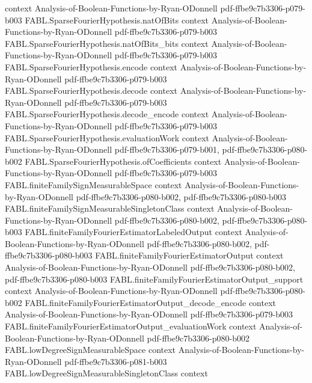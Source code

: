 \begin{theorem}
  {context}
  {Analysis-of-Boolean-Functions-by-Ryan-ODonnell}
  {pdf-ffbe9c7b3306-p079-b003}
\proofstep
  {FABL.SparseFourierHypothesis.natOfBits}
  {context}
  {Analysis-of-Boolean-Functions-by-Ryan-ODonnell}
  {pdf-ffbe9c7b3306-p079-b003}
\proofstep
  {FABL.SparseFourierHypothesis.natOfBits_bits}
  {context}
  {Analysis-of-Boolean-Functions-by-Ryan-ODonnell}
  {pdf-ffbe9c7b3306-p079-b003}
\proofstep
  {FABL.SparseFourierHypothesis.encode}
  {context}
  {Analysis-of-Boolean-Functions-by-Ryan-ODonnell}
  {pdf-ffbe9c7b3306-p079-b003}
\proofstep
  {FABL.SparseFourierHypothesis.decode}
  {context}
  {Analysis-of-Boolean-Functions-by-Ryan-ODonnell}
  {pdf-ffbe9c7b3306-p079-b003}
\proofstep
  {FABL.SparseFourierHypothesis.decode_encode}
  {context}
  {Analysis-of-Boolean-Functions-by-Ryan-ODonnell}
  {pdf-ffbe9c7b3306-p079-b003}
\proofstep
  {FABL.SparseFourierHypothesis.evaluationWork}
  {context}
  {Analysis-of-Boolean-Functions-by-Ryan-ODonnell}
  {pdf-ffbe9c7b3306-p079-b001,
    pdf-ffbe9c7b3306-p080-b002}
\proofstep
  {FABL.SparseFourierHypothesis.ofCoefficients}
  {context}
  {Analysis-of-Boolean-Functions-by-Ryan-ODonnell}
  {pdf-ffbe9c7b3306-p079-b003}
\proofstep
  {FABL.finiteFamilySignMeasurableSpace}
  {context}
  {Analysis-of-Boolean-Functions-by-Ryan-ODonnell}
  {pdf-ffbe9c7b3306-p080-b002,
    pdf-ffbe9c7b3306-p080-b003}
\proofstep
  {FABL.finiteFamilySignMeasurableSingletonClass}
  {context}
  {Analysis-of-Boolean-Functions-by-Ryan-ODonnell}
  {pdf-ffbe9c7b3306-p080-b002,
    pdf-ffbe9c7b3306-p080-b003}
\proofstep
  {FABL.finiteFamilyFourierEstimatorLabeledOutput}
  {context}
  {Analysis-of-Boolean-Functions-by-Ryan-ODonnell}
  {pdf-ffbe9c7b3306-p080-b002,
    pdf-ffbe9c7b3306-p080-b003}
\proofstep
  {FABL.finiteFamilyFourierEstimatorOutput}
  {context}
  {Analysis-of-Boolean-Functions-by-Ryan-ODonnell}
  {pdf-ffbe9c7b3306-p080-b002,
    pdf-ffbe9c7b3306-p080-b003}
\proofstep
  {FABL.finiteFamilyFourierEstimatorOutput_support}
  {context}
  {Analysis-of-Boolean-Functions-by-Ryan-ODonnell}
  {pdf-ffbe9c7b3306-p080-b002}
\proofstep
  {FABL.finiteFamilyFourierEstimatorOutput_decode_encode}
  {context}
  {Analysis-of-Boolean-Functions-by-Ryan-ODonnell}
  {pdf-ffbe9c7b3306-p079-b003}
\proofstep
  {FABL.finiteFamilyFourierEstimatorOutput_evaluationWork}
  {context}
  {Analysis-of-Boolean-Functions-by-Ryan-ODonnell}
  {pdf-ffbe9c7b3306-p080-b002}
\proofstep
  {FABL.lowDegreeSignMeasurableSpace}
  {context}
  {Analysis-of-Boolean-Functions-by-Ryan-ODonnell}
  {pdf-ffbe9c7b3306-p081-b003}
\proofstep
  {FABL.lowDegreeSignMeasurableSingletonClass}
  {context}

\end{theorem}
